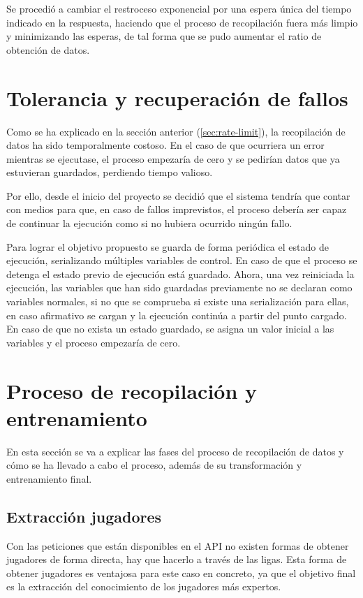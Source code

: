 Se procedió a cambiar el restroceso exponencial por una espera única del tiempo indicado en la respuesta, haciendo que el proceso de recopilación fuera más limpio y minimizando las esperas, de tal forma que se pudo aumentar el ratio de obtención de datos.

\section{Tolerancia y recuperación de fallos}\label{sec:fault-tolerance}
Como se ha explicado en la sección anterior (\ref{sec:rate-limit}), la recopilación de datos ha sido temporalmente costoso. En el caso de que ocurriera un error mientras se ejecutase, el proceso empezaría de cero y se pedirían datos que ya estuvieran guardados, perdiendo tiempo valioso.

Por ello, desde el inicio del proyecto se decidió que el sistema tendría que contar con medios para que, en caso de fallos imprevistos, el proceso debería ser capaz de continuar la ejecución como si no hubiera ocurrido ningún fallo.

Para lograr el objetivo propuesto se guarda de forma periódica el estado de ejecución, serializando múltiples variables de control. En caso de que el proceso se detenga el estado previo de ejecución está guardado. Ahora, una vez reiniciada la ejecución, las variables que han sido guardadas previamente no se declaran como variables normales, si no que se comprueba si existe una serialización para ellas, en caso afirmativo se cargan y la ejecución continúa a partir del punto cargado. En caso de que no exista un estado guardado, se asigna un valor inicial a las variables y el proceso empezaría de cero.

\section{Proceso de recopilación y entrenamiento}
En esta sección se va a explicar las fases del proceso de recopilación de datos y cómo se ha llevado a cabo el proceso, además de su transformación y entrenamiento final.

\subsection{Extracción jugadores}
Con las peticiones que están disponibles en el API no existen formas de obtener jugadores de forma directa, hay que hacerlo a través de las ligas. Esta forma de obtener jugadores es ventajosa para este caso en concreto, ya que el objetivo final es la extracción del conocimiento de los jugadores más expertos.

